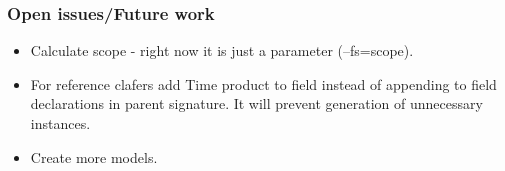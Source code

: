 \documentclass[xcolor=dvipsnames,mathserif,12pt,backend=biber]{beamer}
\begin{document}
  \begin{frame}
    \frametitle{Open issues/Future work}
    \begin{itemize}
      \item Calculate scope - right now it is just a parameter (--fs=scope).
      \item For reference clafers add Time product to  field instead of appending to field declarations in parent signature. It will prevent generation of unnecessary instances.
      \item Create more models.
    \end{itemize}
  \end{frame}
\end{document}

